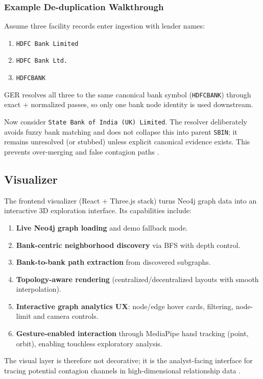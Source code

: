 \subsubsection{Example De-duplication Walkthrough}

Assume three facility records enter ingestion with lender names:

\begin{enumerate}
  \item \texttt{HDFC Bank Limited}
  \item \texttt{HDFC Bank Ltd.}
  \item \texttt{HDFCBANK}
\end{enumerate}

GER resolves all three to the same canonical bank symbol (\texttt{HDFCBANK}) through exact + normalized passes, so only one bank node identity is used downstream.

Now consider \texttt{State Bank of India (UK) Limited}. The resolver deliberately avoids fuzzy bank matching and does not collapse this into parent \texttt{SBIN}; it remains unresolved (or stubbed) unless explicit canonical evidence exists. This prevents over-merging and false contagion paths \cite{ref26}.

\subsection{Visualizer}

The frontend visualizer (React + Three.js stack) turns Neo4j graph data into an interactive 3D exploration interface. Its capabilities include:

\begin{enumerate}
  \item \textbf{Live Neo4j graph loading} and demo fallback mode.
  \item \textbf{Bank-centric neighborhood discovery} via BFS with depth control.
  \item \textbf{Bank-to-bank path extraction} from discovered subgraphs.
  \item \textbf{Topology-aware rendering} (centralized/decentralized layouts with smooth interpolation).
  \item \textbf{Interactive graph analytics UX}: node/edge hover cards, filtering, node-limit and camera controls.
  \item \textbf{Gesture-enabled interaction} through MediaPipe hand tracking (point, orbit), enabling touchless exploratory analysis.
\end{enumerate}

The visual layer is therefore not decorative; it is the analyst-facing interface for tracing potential contagion channels in high-dimensional relationship data \cite{ref23} \cite{ref24} \cite{ref25} \cite{ref26}.
